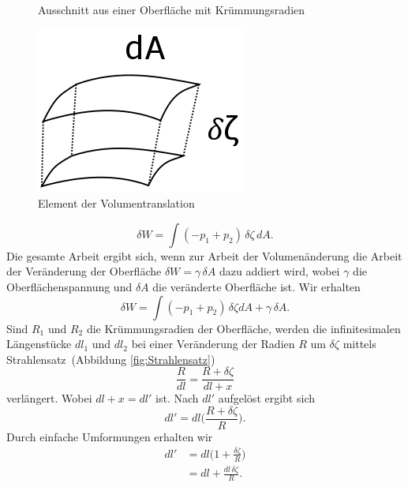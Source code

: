 \begin{refsection}
\begin{figure}
  \caption{Ausschnitt aus einer Oberfläche mit Krümmungsradien} 
  \label{fig:YoungCone}
\end{figure}
\begin{figure}
  \centering
  \includegraphics[scale=0.3]{minimal/Volumetranslation.png}
  \caption{Element der Volumentranslation} 
  \label{fig:Volumentransaltion}
\end{figure}
\begin{equation}
\delta W=\int(-p_1+p_2)\,\delta\zeta\,dA.
\end{equation}
Die gesamte Arbeit ergibt sich, wenn zur Arbeit der Volumenänderung die Arbeit der Veränderung der Oberfläche $\delta W=\gamma \, \delta A $ dazu addiert wird, wobei $\gamma$ die Oberflächenspannung und $\delta A$ die veränderte Oberfläche ist. Wir erhalten
%
\begin{equation}\label{YL-Arbeit_1}
\delta W=\int(-p_1+p_2)\,\delta\zeta dA + \gamma \,\delta A.
\end{equation}
Sind $R_1$ und $R_2$ die Krümmungsradien der Oberfläche, werden die infinitesimalen Längenstücke $dl_1$ und $dl_2$ bei einer Veränderung der Radien $R$ um $\delta\zeta$ mittels Strahlensatz \,(Abbildung \ref{fig:Strahlensatz})
\begin{equation}
\frac{R}{dl}=\frac{R+\delta\zeta}{dl+x}
\end{equation}
verlängert. Wobei $dl+x=dl'$ ist. Nach $dl'$ aufgelöst ergibt sich
\begin{equation}
dl' = dl\bigg(\frac{R+\delta\zeta}{R}\bigg) .
\end{equation}
Durch einfache Umformungen erhalten wir
\begin{equation}
\begin{split}
dl' &= dl\bigg(1+\frac{\delta\zeta}{R}\bigg)\\
&=dl+\frac{dl\,\delta\zeta}{R} .
\end{split} 
\end{equation}
\begin{figure}

\end{figure}
\end{refsection}
